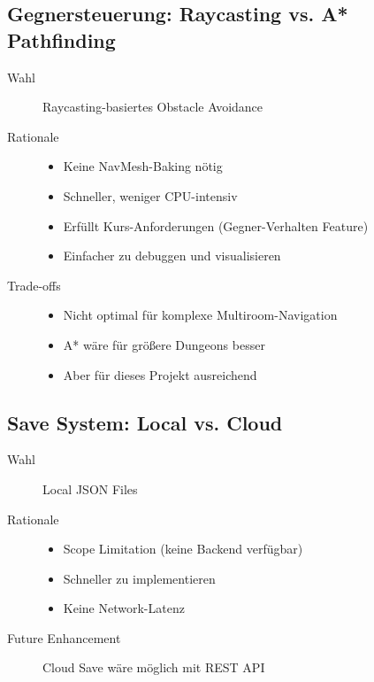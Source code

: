 \documentclass[
  a4paper,
  11pt,
  ngerman,
  parskip=half,
  bibliography=totoc,
  listof=totoc
]{scrreprt}
\begin{document}
\subsection{Gegnersteuerung: Raycasting vs. A* Pathfinding}

\begin{description}
    \item[Wahl] Raycasting-basiertes Obstacle Avoidance
    \item[Rationale]
    \begin{itemize}
        \item Keine NavMesh-Baking nötig
        \item Schneller, weniger CPU-intensiv
        \item Erfüllt Kurs-Anforderungen (Gegner-Verhalten Feature)
        \item Einfacher zu debuggen und visualisieren
    \end{itemize}
    \item[Trade-offs]
    \begin{itemize}
        \item Nicht optimal für komplexe Multiroom-Navigation
        \item A* wäre für größere Dungeons besser
        \item Aber für dieses Projekt ausreichend
    \end{itemize}
\end{description}

\subsection{Save System: Local vs. Cloud}

\begin{description}
    \item[Wahl] Local JSON Files
    \item[Rationale]
    \begin{itemize}
        \item Scope Limitation (keine Backend verfügbar)
        \item Schneller zu implementieren
        \item Keine Network-Latenz
    \end{itemize}
    \item[Future Enhancement] Cloud Save wäre möglich mit REST API
\end{description}

\end{document}
